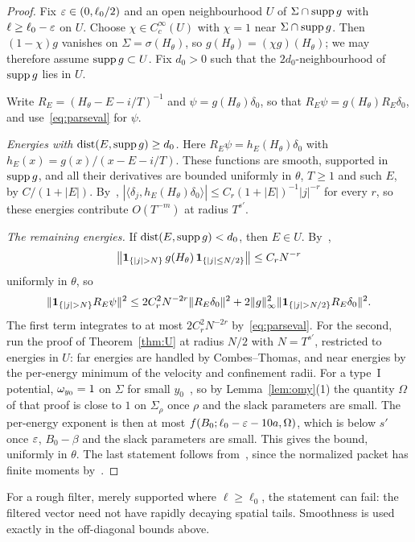 \begin{proof}
Fix $\varepsilon\in(0,\ell_0/2)$ and an open neighbourhood $U$ of $\Sigma\cap\operatorname{supp} g$ with $\ell\ge\ell_0-\varepsilon$ on $U$. Choose $\chi\in C_c^\infty(U)$ with $\chi=1$ near $\Sigma\cap\operatorname{supp} g$. Then $(1-\chi)g$ vanishes on $\Sigma=\sigma(H_\theta)$, so $g(H_\theta)=(\chi g)(H_\theta)$; we may therefore assume $\operatorname{supp} g\subset U$. Fix $d_0>0$ such that the $2d_0$-neighbourhood of $\operatorname{supp} g$ lies in $U$.

Write $R_E=(H_\theta-E-i/T)^{-1}$ and $\psi=g(H_\theta)\delta_0$, so that $R_E\psi=g(H_\theta)R_E\delta_0$, and use~\eqref{eq:parseval} for $\psi$.

\emph{Energies with $\operatorname{dist}(E,\operatorname{supp} g)\ge d_0$.} Here $R_E\psi=h_E(H_\theta)\delta_0$ with $h_E(x)=g(x)/(x-E-i/T)$. These functions are smooth, supported in $\operatorname{supp} g$, and all their derivatives are bounded uniformly in $\theta$, $T\ge1$ and such $E$, by $C/(1+|E|)$. By~\cite[Lemma~2.8]{DMuniv}, $|\langle\delta_j,h_E(H_\theta)\delta_0\rangle|\le C_r(1+|E|)^{-1}|j|^{-r}$ for every $r$, so these energies contribute $O(T^{-m})$ at radius $T^{s'}$.

\emph{The remaining energies.} If $\operatorname{dist}(E,\operatorname{supp} g)<d_0$, then $E\in U$. By~\cite[Lemma~2.8]{DMuniv},
\[
\bigl\|\un_{\{|j|>N\}}\,g(H_\theta)\,\un_{\{|j|\le N/2\}}\bigr\|\le C_rN^{-r}
\]
uniformly in $\theta$, so
\[
\|\un_{\{|j|>N\}}R_E\psi\|^2\le2C_r^2N^{-2r}\|R_E\delta_0\|^2+2\|g\|_\infty^2\|\un_{\{|j|>N/2\}}R_E\delta_0\|^2.
\]
The first term integrates to at most $2C_r^2N^{-2r}$ by~\eqref{eq:parseval}. For the second, run the proof of Theorem~\ref{thm:U} at radius $N/2$ with $N=T^{s'}$, restricted to energies in $U$: far energies are handled by Combes--Thomas, and near energies by the per-energy minimum of the velocity and confinement radii. For a type~I potential, $\omega_{y_0}=1$ on $\Sigma$ for small $y_0$~\cite[Lemma~5.2]{DMuniv}, so by Lemma~\ref{lem:omy}(1) the quantity $\Omega$ of that proof is close to $1$ on $\Sigma_\rho$ once $\rho$ and the slack parameters are small. The per-energy exponent is then at most $f(B_0;\ell_0-\varepsilon-10a,\Omega)$, which is below $s'$ once $\varepsilon$, $B_0-\beta$ and the slack parameters are small. This gives the bound, uniformly in $\theta$. The last statement follows from~\cite[Lemma~2.3]{DMuniv}, since the normalized packet has finite moments by~\cite[Lemma~2.8]{DMuniv}.
\end{proof}

For a rough filter, merely supported where $\ell\ge\ell_0$, the statement can fail: the filtered vector need not have rapidly decaying spatial tails. Smoothness is used exactly in the off-diagonal bounds above.

